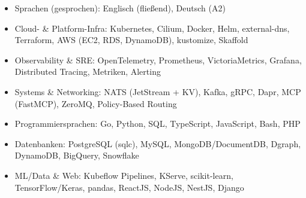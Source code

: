 \documentclass[10pt,a4paper]{resume}
\begin{document}
\begin{itemize}[leftmargin=1.4em,nosep,topsep=2pt]
  \item Sprachen (gesprochen): Englisch (fließend), Deutsch (A2)
  \item Cloud- \& Platform-Infra: Kubernetes, Cilium, Docker, Helm, external-dns, Terraform, AWS (EC2, RDS, DynamoDB), kustomize, Skaffold
  \item Observability \& SRE: OpenTelemetry, Prometheus, VictoriaMetrics, Grafana, Distributed Tracing, Metriken, Alerting
  \item Systems \& Networking: NATS (JetStream + KV), Kafka, gRPC, Dapr, MCP (FastMCP), ZeroMQ, Policy-Based Routing
  \item Programmiersprachen: Go, Python, SQL, TypeScript, JavaScript, Bash, PHP
  \item Datenbanken: PostgreSQL (sqlc), MySQL, MongoDB/DocumentDB, Dgraph, DynamoDB, BigQuery, Snowflake
  \item ML/Data \& Web: Kubeflow Pipelines, KServe, scikit-learn, TensorFlow/Keras, pandas, ReactJS, NodeJS, NestJS, Django
\end{itemize}
\end{document}
